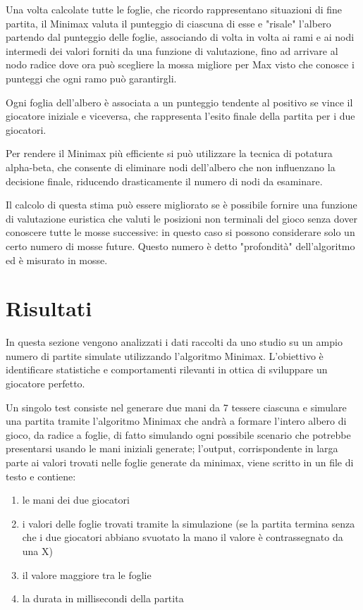\documentclass[a4paper,12pt]{report}
\begin{document}
Una volta calcolate tutte le foglie, che ricordo rappresentano situazioni di fine partita, il Minimax valuta il punteggio di ciascuna di esse e "risale" l'albero partendo dal punteggio delle foglie, associando di volta in volta ai rami e ai nodi intermedi dei valori forniti da una funzione di valutazione, fino ad arrivare al nodo radice dove ora può scegliere la mossa migliore per Max visto che conosce i punteggi che ogni ramo può garantirgli.

Ogni foglia dell’albero è associata a un punteggio tendente al positivo se vince il giocatore iniziale e viceversa, che rappresenta l’esito finale della partita per i due giocatori. 

Per rendere il Minimax più efficiente si può utilizzare la tecnica di potatura alpha-beta, che consente di eliminare nodi dell’albero che non influenzano la decisione finale, riducendo drasticamente il numero di nodi da esaminare. 

Il calcolo di questa stima può essere migliorato se è possibile fornire una funzione di valutazione euristica che valuti le posizioni non terminali del gioco senza dover conoscere tutte le mosse successive: in questo caso si possono considerare solo un certo numero di mosse future. 
Questo numero è detto "profondità" dell'algoritmo ed è misurato in mosse.

\chapter{Risultati}

In questa sezione vengono analizzati i dati raccolti da uno studio su un ampio numero di partite simulate utilizzando l'algoritmo Minimax. 
L'obiettivo è identificare statistiche e comportamenti rilevanti in ottica di sviluppare un giocatore perfetto.

Un singolo test consiste nel generare due mani da 7 tessere ciascuna e simulare una partita tramite l'algoritmo Minimax che andrà a formare l'intero albero di gioco, da radice a foglie, di fatto simulando ogni possibile scenario che potrebbe presentarsi usando le mani iniziali generate; l'output, corrispondente in larga parte ai valori trovati nelle foglie generate da minimax, viene scritto in un file di testo e contiene:

\begin{enumerate}
    \item le mani dei due giocatori
    \item i valori delle foglie trovati tramite la simulazione (se la partita termina senza che i due giocatori abbiano svuotato la mano il valore è contrassegnato da una X)
    \item il valore maggiore tra le foglie
    \item la durata in millisecondi della partita
\end{enumerate}
\end{document}
